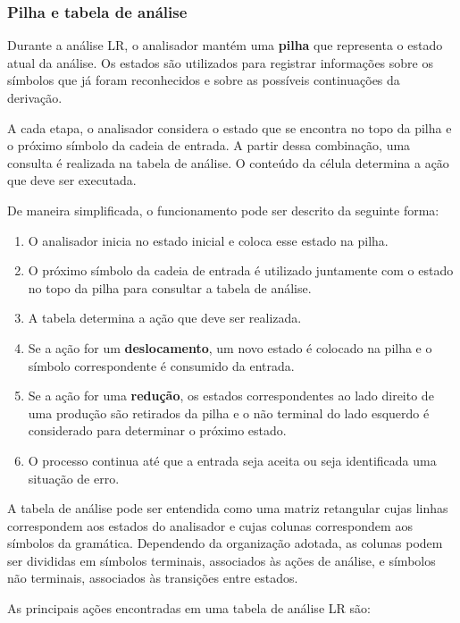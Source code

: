 \documentclass[
  brazilian,
  letterpaper,
]{book}
\theoremstyle{plain}
\theoremstyle{definition}
\theoremstyle{remark}
\begin{document}
\subsubsection{Pilha e tabela de
análise}\label{pilha-e-tabela-de-anuxe1lise}

Durante a análise LR, o analisador mantém uma \textbf{pilha} que
representa o estado atual da análise. Os estados são utilizados para
registrar informações sobre os símbolos que já foram reconhecidos e
sobre as possíveis continuações da derivação.

A cada etapa, o analisador considera o estado que se encontra no topo da
pilha e o próximo símbolo da cadeia de entrada. A partir dessa
combinação, uma consulta é realizada na tabela de análise. O conteúdo da
célula determina a ação que deve ser executada.

De maneira simplificada, o funcionamento pode ser descrito da seguinte
forma:

\begin{enumerate}
\def\labelenumi{\arabic{enumi}.}
\item
  O analisador inicia no estado inicial e coloca esse estado na pilha.
\item
  O próximo símbolo da cadeia de entrada é utilizado juntamente com o
  estado no topo da pilha para consultar a tabela de análise.
\item
  A tabela determina a ação que deve ser realizada.
\item
  Se a ação for um \textbf{deslocamento}, um novo estado é colocado na
  pilha e o símbolo correspondente é consumido da entrada.
\item
  Se a ação for uma \textbf{redução}, os estados correspondentes ao lado
  direito de uma produção são retirados da pilha e o não terminal do
  lado esquerdo é considerado para determinar o próximo estado.
\item
  O processo continua até que a entrada seja aceita ou seja identificada
  uma situação de erro.
\end{enumerate}

A tabela de análise pode ser entendida como uma matriz retangular cujas
linhas correspondem aos estados do analisador e cujas colunas
correspondem aos símbolos da gramática. Dependendo da organização
adotada, as colunas podem ser divididas em símbolos terminais,
associados às ações de análise, e símbolos não terminais, associados às
transições entre estados.

As principais ações encontradas em uma tabela de análise LR são:
\end{document}
